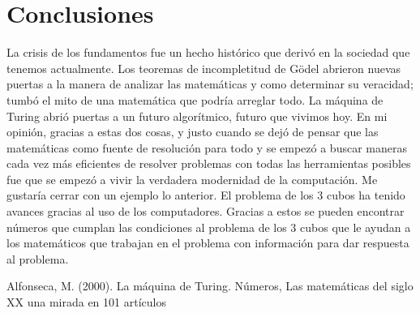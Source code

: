 \documentclass[conference,compsoc]{IEEEtran}
\begin{document}
\section {Conclusiones}
La crisis de los fundamentos fue un hecho histórico que derivó en la sociedad que tenemos actualmente. 
\newline
Los teoremas de incompletitud de Gödel abrieron nuevas puertas a la manera de analizar las matemáticas y como determinar su veracidad; tumbó el mito de una matemática que podría arreglar todo.
\newline
La máquina de Turing abrió puertas a un futuro algorítmico, futuro que vivimos hoy.
\newline
En mi opinión, gracias a estas dos cosas, y justo cuando se dejó de pensar que las matemáticas como fuente de resolución para todo y se empezó a buscar maneras cada vez más eficientes de resolver problemas con todas las herramientas posibles fue que se empezó a vivir la verdadera modernidad de la computación.
\newline
Me gustaría cerrar con un ejemplo lo anterior.
\newline
El problema de los 3 cubos ha tenido avances gracias al uso de los computadores. Gracias a estos se pueden encontrar números que cumplan las condiciones al problema de los 3 cubos que le ayudan a los matemáticos que trabajan en el problema con información para dar respuesta al problema.
\begin{thebibliography}{1}
 Alfonseca, M. (2000). La máquina de Turing. Números, Las matemáticas del siglo XX una mirada en 101 artículos
\end{thebibliography}
\end{document}
